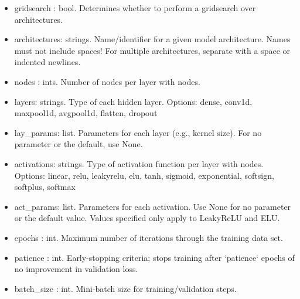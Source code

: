 \documentclass[letterpaper, 12pt]{article}
\begin{document}
\begin{itemize}
\item gridsearch : bool. Determines whether to perform a gridsearch over 
                         architectures.
\item architectures: strings. Name/identifier for a given model architecture.  
                         Names must not include spaces!
                         For multiple architectures, separate with a space or 
                         indented newlines.
\item nodes : ints. Number of nodes per layer with nodes.
\item layers: strings. Type of each hidden layer.  
                       Options: dense, conv1d, maxpool1d, avgpool1d, flatten, 
                                dropout
\item lay\_params: list. Parameters for each layer (e.g., kernel size). 
                        For no parameter or the default, use None.
\item activations: strings. Type of activation function per layer with nodes.
                        Options: linear, relu, leakyrelu, elu, tanh, sigmoid, 
                                 exponential, softsign, softplus, softmax
\item act\_params: list. Parameters for each activation.  
                        Use None for no parameter or the default value.
                        Values specified only apply to LeakyReLU and ELU.

\item epochs     : int.  Maximum number of iterations through the training data set.
\item patience   : int.  Early-stopping criteria; stops training after `patience` 
                   epochs of no improvement in validation loss.
\item batch\_size : int.  Mini-batch size for training/validation steps.


\end{itemize}
\end{document}
